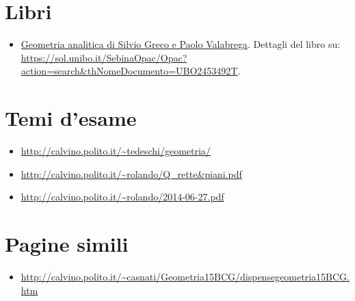 \documentclass[a4paper,10pt]{article}
\begin{document}
\section{Libri}
  \begin{itemize}
   \item \href{./libro001.html}{Geometria analitica di Silvio Greco e Paolo Valabrega}. Dettagli del libro su: \url{https://sol.unibo.it/SebinaOpac/Opac?action=search&thNomeDocumento=UBO2453492T}.
  \end{itemize}

\section{Temi d'esame}
  \begin{itemize}
   \item \url{http://calvino.polito.it/~tedeschi/geometria/}
   \item \url{http://calvino.polito.it/~rolando/Q_rette&piani.pdf}
   \item \url{http://calvino.polito.it/~rolando/2014-06-27.pdf}
  \end{itemize}

\section{Pagine simili}
\begin{itemize}
  \item \url{http://calvino.polito.it/~casnati/Geometria15BCG/dispensegeometria15BCG.htm}
\end{itemize}
\end{document}
